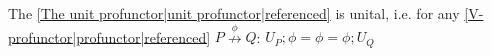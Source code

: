 
The \ref{The unit profunctor|unit profunctor|referenced} is unital, i.e. for any \ref{V-profunctor|profunctor|referenced} $P \overset{\phi}\nrightarrow Q$:  $U_P;\phi = \phi = \phi; U_Q$